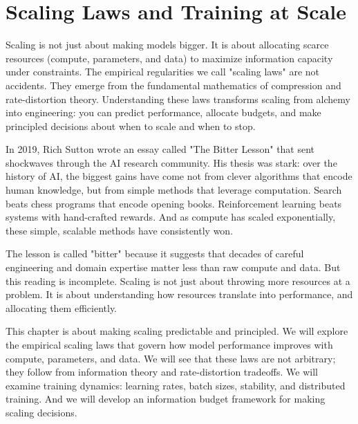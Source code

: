 
\chapter{Scaling Laws and Training at Scale}

\begin{keyinsight}
Scaling is not just about making models bigger. It is about allocating scarce resources (compute, parameters, and data) to maximize information capacity under constraints. The empirical regularities we call "scaling laws" are not accidents. They emerge from the fundamental mathematics of compression and rate-distortion theory. Understanding these laws transforms scaling from alchemy into engineering: you can predict performance, allocate budgets, and make principled decisions about when to scale and when to stop.
\end{keyinsight}

\vspace{1.5em}

In 2019, Rich Sutton wrote an essay called "The Bitter Lesson" \citep{sutton2019bitter} that sent shockwaves through the AI research community. His thesis was stark: over the history of AI, the biggest gains have come not from clever algorithms that encode human knowledge, but from simple methods that leverage computation. Search beats chess programs that encode opening books. Reinforcement learning beats systems with hand-crafted rewards. And as compute has scaled exponentially, these simple, scalable methods have consistently won.

The lesson is called "bitter" because it suggests that decades of careful engineering and domain expertise matter less than raw compute and data. But this reading is incomplete. Scaling is not just about throwing more resources at a problem. It is about understanding how resources translate into performance, and allocating them efficiently.

This chapter is about making scaling predictable and principled. We will explore the empirical scaling laws that govern how model performance improves with compute, parameters, and data. We will see that these laws are not arbitrary; they follow from information theory and rate-distortion tradeoffs. We will examine training dynamics: learning rates, batch sizes, stability, and distributed training. And we will develop an information budget framework for making scaling decisions.

